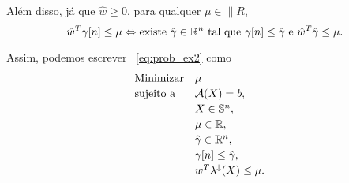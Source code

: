 \begin{homeworkProblemAnswer}
Além disso, já que $\hat{w} \geq 0$, para qualquer $\mu \in \|{R}$,
$$
    \hat{w}^T \gamma[n] \leq \mu \Leftrightarrow 
    \text{existe } \hat{\gamma} \in \mathbb{R}^n \text{ tal que } \gamma[n] \leq \hat{\gamma} \text{ e } \hat{w}^T\hat{\gamma} \leq \mu.
$$

Assim, podemos escrever ~\eqref{eq:prob_ex2} como 
\begin{equation*}
    \begin{array}[!h]{lll}
        \text{Minimizar} & \mu                                              & \\[2pt]
        \text{sujeito a} & \"{A}(X) = b,                                    & \\[2pt]
                         & X \in \|{S}^n,                                   & \\[2pt]
                         & \mu \in \|{R},                                   & \\[2pt]
                         & \hat{\gamma} \in \|{R}^n,                        & \\[2pt]
                         & \gamma[n] \leq \hat{\gamma},                     & \\[2pt]
                         & w^T \eigen(X) \leq \mu.                          & \\
    \end{array}
\end{equation*}

\end{homeworkProblemAnswer}


